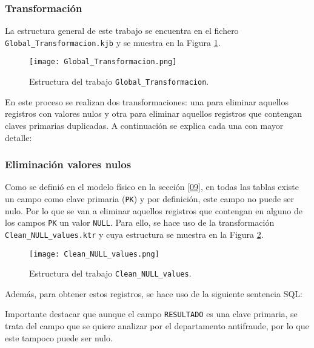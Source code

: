 \newpage
\medskip
\subsubsection{Transformación}
\label{Transformacion}
La estructura general de este trabajo se encuentra en el fichero \texttt{Global\_Transformacion.kjb} y se muestra en la Figura \ref{Global_Transformacion}.

\begin{figure}[!th]
\texttt{[image: Global\_Transformacion.png]}
\centering
\caption{Estructura del trabajo \texttt{Global\_Transformacion}.}
\label{Global_Transformacion}
\end{figure}

En este proceso se realizan dos transformaciones: una para eliminar aquellos registros con valores nulos y otra para eliminar aquellos registros que contengan claves primarias duplicadas. A continuación se explica cada una con mayor detalle:


\medskip
\subsubsection*{Eliminación valores nulos}
Como se definió en el modelo físico en la sección \ref{09}, en todas las tablas existe un campo como clave primaria (\texttt{PK}) y por definición, este campo no puede ser nulo. Por lo que se van a eliminar aquellos registros que contengan en alguno de los campos \texttt{PK} un valor \texttt{NULL}. Para ello, se hace uso de la transformación \texttt{Clean\_NULL\_values.ktr} y cuya estructura se muestra en la Figura \ref{NULL_values}.

\begin{figure}[!th]
\texttt{[image: Clean\_NULL\_values.png]}
\centering
\caption{Estructura del trabajo \texttt{Clean\_NULL\_values}.}
\label{NULL_values}
\end{figure}

Además, para obtener estos registros, se hace uso de la siguiente sentencia SQL:


Importante destacar que aunque el campo \texttt{RESULTADO} es una clave primaria, se trata del campo que se quiere analizar por el departamento antifraude, por lo que este tampoco puede ser nulo.


\newpage
\medskip
